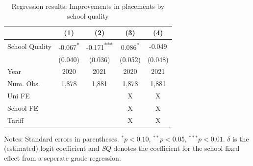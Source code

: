 
\begin{table}[htbp]\centering
\caption{Regression results: Improvements in placements by school quality}
\begin{tabular}{lcc|cc}
\toprule
 & (1) & (2) & (3) & (4) \\
\midrule
School Quality & -0.067\textsuperscript{*} & -0.171\textsuperscript{***} & 0.086\textsuperscript{*} & -0.049 \\
               & (0.040) & (0.036) & (0.052) & (0.048) \\
\midrule
Year & 2020 & 2021 & 2020 & 2021 \\
Num. Obs.      & 1,878 & 1,881 & 1,878 & 1,881 \\
Uni FE         &  &  & X & X \\
School FE      &  &  & X & X \\
Tariff         &  &  & X & X \\ 
\bottomrule
\end{tabular}

\vspace{2pt}
\footnotesize{Notes: Standard errors in parentheses. ${}^{*}p<0.10$, ${}^{**}p<0.05$, ${}^{***}p<0.01$. $\delta$ is the (estimated) logit coefficient and $SQ$ denotes the coefficient for the school fixed effect from a seperate grade regression.}
\label{tab:placement_main}
\end{table}

